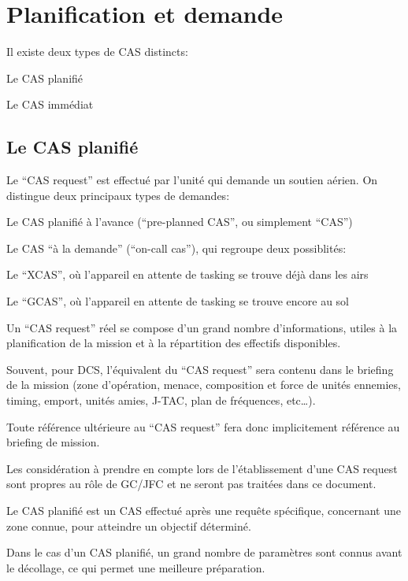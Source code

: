 \newpage

\chapter{Planification et demande}

\e
    \item Il existe deux types de CAS distincts:
    \ee
        \item Le CAS planifié
        \item Le CAS immédiat
    \ed
\ed

\section{Le CAS planifié}

\e
    \item Le “CAS request” est effectué par l’unité qui demande un soutien aérien. On distingue deux principaux types de demandes:
    \ee
        \item Le CAS planifié à l’avance (“pre-planned CAS”, ou simplement “CAS”)
        \item Le CAS “à la demande” (“on-call cas”), qui regroupe deux possiblités:
        \eee
            \item Le “XCAS”, où l’appareil en attente de tasking se trouve déjà dans les airs
            \item Le “GCAS”, où l’appareil en attente de tasking se trouve encore au sol
        \ed
    \ed
    \item Un “CAS request” réel se compose d’un grand nombre d’informations, utiles à la planification de la mission et à la répartition des effectifs disponibles.
    \item
    Souvent, pour DCS, l’équivalent du “CAS request” sera contenu dans le briefing de la mission (zone d’opération, menace, composition et force de unités ennemies, timing, emport, unités amies, J-TAC, plan de fréquences, etc…).
    \item Toute référence ultérieure au “CAS request” fera donc implicitement référence au briefing de mission.
    \item Les considération à prendre en compte lors de l’établissement d’une CAS request sont propres au rôle de GC/JFC et ne seront pas traitées dans ce document.
    \item Le CAS planifié est un CAS effectué après une requête spécifique, concernant une zone connue, pour atteindre un objectif déterminé.
    \item Dans le cas d’un CAS planifié, un grand nombre de paramètres sont connus avant le décollage, ce qui permet une meilleure préparation.
\ed

